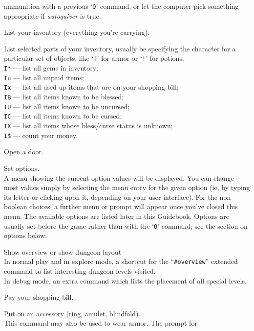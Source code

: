 ammunition with a previous `{\tt Q}' command, or let the computer pick
something appropriate if {\it autoquiver\/} is true.
\item[\tb{i}]
List your inventory (everything you're carrying).
\item[\tb{I}]
List selected parts of your inventory, usually be specifying the character
for a particular set of objects, like `{\tt [}' for armor or `{\tt !}'
for potions.\\
{\tt I*} --- list all gems in inventory;\\
{\tt Iu} --- list all unpaid items;\\
{\tt Ix} --- list all used up items that are on your shopping bill;\\
{\tt IB} --- list all items known to be blessed;\\
{\tt IU} --- list all items known to be uncursed;\\
{\tt IC} --- list all items known to be cursed;\\
{\tt IX} --- list all items whose bless/curse status is unknown;\\
{\tt I\$} --- count your money.
\item[\tb{o}]
Open a door.
\item[\tb{O}]
Set options.\\
A menu showing the current option values will be
displayed.  You can change most values simply by selecting the menu
entry for the given option (ie, by typing its letter or clicking upon
it, depending on your user interface).  For the non-boolean choices,
a further menu or prompt will appear once you've closed this menu.
The available options
are listed later in this Guidebook.  Options are usually set before the
game rather than with the `{\tt O}' command; see the section on options below.
\item[\tb{\^{}O}]
Show overview or show dungeon layout\\
In normal play and in explore mode, a shortcut for the ``{\tt \#overview}''
extended command to list interesting dungeon levels visited.\\
In debug mode, an extra command which lists the placement of all special
levels.
\item[\tb{p}]
Pay your shopping bill.
\item[\tb{P}]
Put on an accessory (ring, amulet, blindfold).\\
This command may also be used to wear armor.  The prompt for
